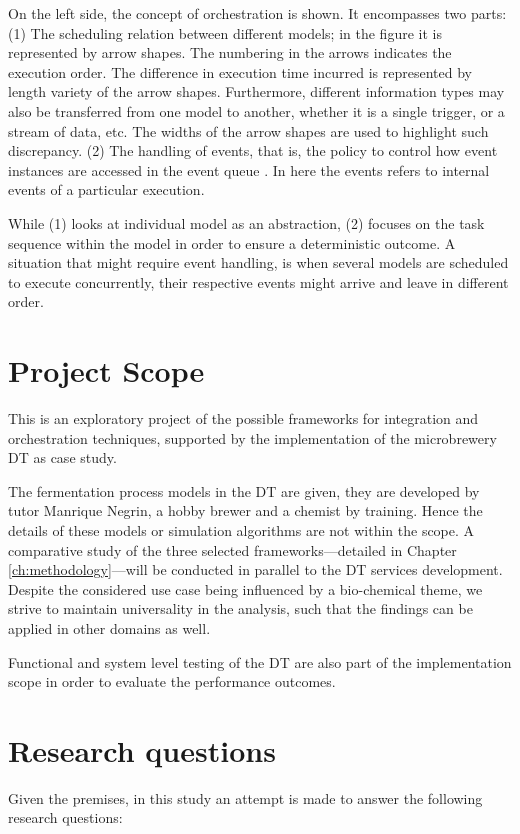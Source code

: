On the left side, the concept of orchestration is shown. It encompasses two parts: (1) The scheduling relation between different models; in the figure it is represented by arrow shapes. The numbering in the arrows indicates the execution order. The difference in execution time incurred is represented by length variety of the arrow shapes. Furthermore, different information types may also be transferred from one model to another, whether it is a single trigger, or a stream of data, etc. The widths of the arrow shapes are used to highlight such discrepancy. (2) The handling of events, that is, the policy to control how event instances are accessed in the event queue \cite{Ptolemaeus2014}. In here the events refers to internal events of a particular execution. 

While (1) looks at individual model as an abstraction, (2) focuses on the task sequence within the model in order to ensure a deterministic outcome. A situation that might require event handling, is when several models are scheduled to execute concurrently, their respective events might arrive and leave in different order.

\section{Project Scope}\label{sec:scope}
This is an exploratory project of the possible frameworks for integration and orchestration techniques, supported by the implementation of the microbrewery DT as case study. 

The fermentation process models in the DT are given, they are developed by tutor Manrique Negrin, a hobby brewer and a chemist by training. Hence the details of these models or simulation algorithms are not within the scope. A comparative study of the three selected frameworks---detailed in Chapter \ref{ch:methodology}---will be conducted in parallel to the DT services development. Despite the considered use case being influenced by a bio-chemical theme, we strive to maintain universality in the analysis, such that the findings can be applied in other domains as well.

Functional and system level testing of the DT are also part of the implementation scope in order to evaluate the performance outcomes.

\section{Research questions}\label{sec:rqs}
Given the premises, in this study an attempt is made to answer the following research questions: 

